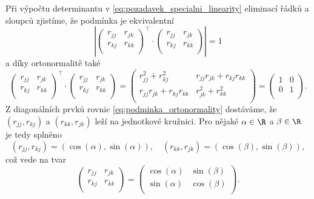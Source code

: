 Při výpočtu determinantu v \ref{eq:pozadavek_specialni_linearity} eliminací řádků a sloupců zjistíme, že podmínka je ekvivalentní
\[
	\left|
	\begin{pmatrix}
		r_{jj} & r_{jk} \\
		r_{kj} & r_{kk} \\
	\end{pmatrix}^{\top}
	\cdot
	\begin{pmatrix}
		r_{jj} & r_{jk} \\
		r_{kj} & r_{kk} \\
	\end{pmatrix}
	\right| = 1
\]
a díky ortonormalitě také
\begin{equation}
	\label{eq:podminka_ortonormality}
	\begin{pmatrix}
		r_{jj} & r_{jk} \\
		r_{kj} & r_{kk} \\
	\end{pmatrix}^{\top}
	\cdot
	\begin{pmatrix}
		r_{jj} & r_{jk} \\
		r_{kj} & r_{kk} \\
	\end{pmatrix} =
	\begin{pmatrix}
		r_{jj}^2 + r_{kj}^2         & r_{jj}r_{jk} + r_{kj}r_{kk} \\
		r_{jj}r_{jk} + r_{kj}r_{kk} & r_{jk}^2 + r_{kk}^2         \\
	\end{pmatrix} =
	\begin{pmatrix}
		1 & 0 \\
		0 & 1 \\
	\end{pmatrix}.
\end{equation}
Z diagonálních prvků rovnic \ref{eq:podminka_ortonormality} dostáváme, že $(r_{jj},r_{kj})$ a $(r_{kk}, r_{jk})$ leží na jednotkové kružnici. Pro nějaké $\alpha \in \R$ a $\beta \in \R$ je tedy splněno
\[
	(r_{jj},r_{kj}) = (\cos(\alpha), \sin(\alpha)), \quad (r_{kk}, r_{jk}) = (\cos(\beta), \sin(\beta)),
\]
což vede na tvar
\begin{equation}
	\label{eq:podminka_diagonalnich_prvku}
	\begin{pmatrix}
		r_{jj} & r_{jk} \\
		r_{kj} & r_{kk} \\
	\end{pmatrix}  =
	\begin{pmatrix}
		\cos(\alpha) & \sin(\beta) \\
		\sin(\alpha) & \cos(\beta) \\
	\end{pmatrix}.
\end{equation}


